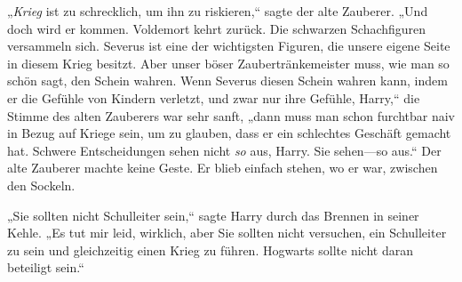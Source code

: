 „\emph{Krieg} ist zu schrecklich, um ihn zu riskieren,“ sagte der alte Zauberer. „Und doch wird er kommen. Voldemort kehrt zurück. Die schwarzen Schachfiguren versammeln sich. Severus ist eine der wichtigsten Figuren, die unsere eigene Seite in diesem Krieg besitzt. Aber unser böser Zaubertränkemeister muss, wie man so schön sagt, den Schein wahren. Wenn Severus diesen Schein wahren kann, indem er die Gefühle von Kindern verletzt, und zwar nur ihre Gefühle, Harry,“ die Stimme des alten Zauberers war sehr sanft, „dann muss man schon furchtbar naiv in Bezug auf Kriege sein, um zu glauben, dass er ein schlechtes Geschäft gemacht hat. Schwere Entscheidungen sehen nicht \emph{so} aus, Harry. Sie sehen—so aus.“ Der alte Zauberer machte keine Geste. Er blieb einfach stehen, wo er war, zwischen den Sockeln.

„Sie sollten nicht Schulleiter sein,“ sagte Harry durch das Brennen in seiner Kehle. „Es tut mir leid, wirklich, aber Sie sollten nicht versuchen, ein Schulleiter zu sein und gleichzeitig einen Krieg zu führen. Hogwarts sollte nicht daran beteiligt sein.“

